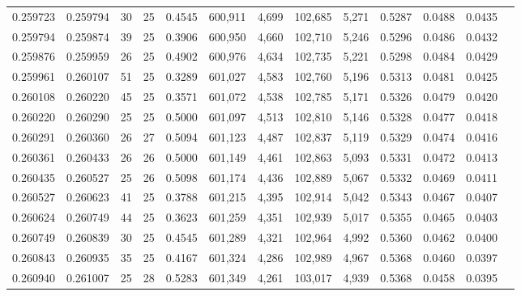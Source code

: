\begin{tabular}{rrrrrrrrrrrrr}
0.259723 & 0.259794 &    30 &  25 &                                     0.4545 & 600,911 &   4,699 & 102,685 &   5,271 & 0.5287 & 0.0488 & 0.0435 \\
0.259794 & 0.259874 &    39 &  25 &                                     0.3906 & 600,950 &   4,660 & 102,710 &   5,246 & 0.5296 & 0.0486 & 0.0432 \\
0.259876 & 0.259959 &    26 &  25 &                                     0.4902 & 600,976 &   4,634 & 102,735 &   5,221 & 0.5298 & 0.0484 & 0.0429 \\
0.259961 & 0.260107 &    51 &  25 &                                     0.3289 & 601,027 &   4,583 & 102,760 &   5,196 & 0.5313 & 0.0481 & 0.0425 \\
0.260108 & 0.260220 &    45 &  25 &                                     0.3571 & 601,072 &   4,538 & 102,785 &   5,171 & 0.5326 & 0.0479 & 0.0420 \\
0.260220 & 0.260290 &    25 &  25 &                                     0.5000 & 601,097 &   4,513 & 102,810 &   5,146 & 0.5328 & 0.0477 & 0.0418 \\
0.260291 & 0.260360 &    26 &  27 &                                     0.5094 & 601,123 &   4,487 & 102,837 &   5,119 & 0.5329 & 0.0474 & 0.0416 \\
0.260361 & 0.260433 &    26 &  26 &                                     0.5000 & 601,149 &   4,461 & 102,863 &   5,093 & 0.5331 & 0.0472 & 0.0413 \\
0.260435 & 0.260527 &    25 &  26 &                                     0.5098 & 601,174 &   4,436 & 102,889 &   5,067 & 0.5332 & 0.0469 & 0.0411 \\
0.260527 & 0.260623 &    41 &  25 &                                     0.3788 & 601,215 &   4,395 & 102,914 &   5,042 & 0.5343 & 0.0467 & 0.0407 \\
0.260624 & 0.260749 &    44 &  25 &                                     0.3623 & 601,259 &   4,351 & 102,939 &   5,017 & 0.5355 & 0.0465 & 0.0403 \\
0.260749 & 0.260839 &    30 &  25 &                                     0.4545 & 601,289 &   4,321 & 102,964 &   4,992 & 0.5360 & 0.0462 & 0.0400 \\
0.260843 & 0.260935 &    35 &  25 &                                     0.4167 & 601,324 &   4,286 & 102,989 &   4,967 & 0.5368 & 0.0460 & 0.0397 \\
0.260940 & 0.261007 &    25 &  28 &                                     0.5283 & 601,349 &   4,261 & 103,017 &   4,939 & 0.5368 & 0.0458 & 0.0395 \\

\end{tabular}
